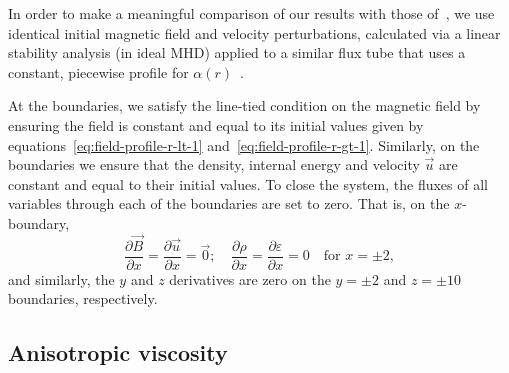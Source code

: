 In order to make a meaningful comparison of our results with those of~\cite{hoodCoronalHeatingMagnetic2009}, we use identical initial magnetic field and velocity perturbations, calculated via a linear stability analysis (in ideal MHD) applied to a similar flux tube that uses a constant, piecewise profile for $\alpha(r)$~\cite{vanderlindenCompleteCoronalLoop1999,browningSolarCoronalHeating2003c,browningHeatingCoronaNanoflares2008a}.

At the boundaries, we satisfy the line-tied condition on the magnetic field by ensuring the field is constant and equal to its initial values given by equations~\eqref{eq:field-profile-r-lt-1} and~\eqref{eq:field-profile-r-gt-1}. Similarly, on the boundaries we ensure that the density, internal energy and velocity $\vec{u}$ are constant and equal to their initial values. To close the system, the fluxes of all variables through each of the boundaries are set to zero. That is, on the $x$-boundary,
\begin{equation}
  \frac{\partial \vec{B}}{\partial x} = \frac{\partial \vec{u}}{\partial x} = \vec{0}; \quad \frac{\partial \rho}{\partial x} = \frac{\partial \varepsilon}{\partial x} = 0 \quad \text{for } x=\pm 2,
\end{equation}
and similarly, the $y$ and $z$ derivatives are zero on the $y=\pm2$ and $z=\pm10$ boundaries, respectively.

\subsection{Anisotropic viscosity}

